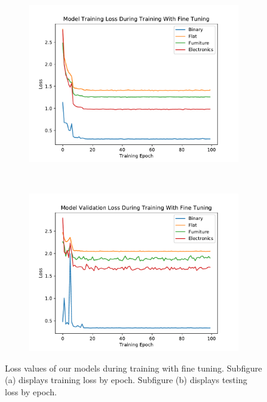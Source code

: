 \begin{figure}
    \centering
    \begin{subfigure}[t]{0.5\columnwidth}
        \centering
        \includegraphics[width=\textwidth]{img/true_losses_train}
        \caption{}
    \end{subfigure}%
    ~ 
    \begin{subfigure}[t]{0.5\columnwidth}
        \centering
        \includegraphics[width=\textwidth]{img/true_losses_val}
        \caption{}
    \end{subfigure}%
	\caption{
Loss values of our models during training with fine tuning.
Subfigure (a) displays training loss by epoch.
Subfigure (b) displays testing loss by epoch. 
}
\label{fig:true_losses}
\end{figure}